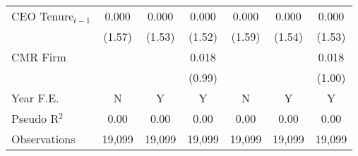 {\begin{tabular}{l*{6}{c}}
CEO Tenure$ _{t-1} $&    0.000         &    0.000         &    0.000         &    0.000         &    0.000         &    0.000         \\
          &   (1.57)         &   (1.53)         &   (1.52)         &   (1.59)         &   (1.54)         &   (1.53)         \\
CMR Firm  &                  &                  &    0.018         &                  &                  &    0.018         \\
          &                  &                  &   (0.99)         &                  &                  &   (1.00)         \\
\midrule Year F.E. &        N         &        Y         &        Y         &        N         &        Y         &        Y         \\

Pseudo R$ ^2$&     0.00         &     0.00         &     0.00         &     0.00         &     0.00         &     0.00         \\
Observations&   19,099         &   19,099         &   19,099         &   19,099         &   19,099         &   19,099         \\
\bottomrule
\end{tabular}
}
